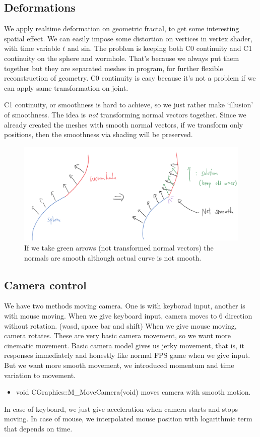 \documentclass[a4paper]{article}
\begin{document}
\subsection{Deformations}
We apply realtime deformation on geometric fractal, to get some interesting spatial effect.
We can easily impose some distortion on vertices in vertex shader, with time variable $t$ and sin.
The problem is keeping both C0 continuity and C1 continuity on the sphere and wormhole.
That's because we always put them together but they are separated meshes in program, for further flexible reconstruction of geometry.
C0 continuity is easy because it's not a problem if we can apply same transformation on joint.

C1 continuity, or smoothness is hard to achieve, so we just rather make `illusion' of smoothness.
The idea is \textit{not} transforming normal vectors together.
Since we already created the meshes with smooth normal vectors, if we transform only positions, then the smoothness via shading will be preserved.

\begin{figure}[H]
\centering
\includegraphics[scale=0.5]{smooth.png}
\caption[q]{If we take green arrows (not transformed normal vectors) the normals are smooth although actual curve is not smooth.}
\label{fig:tree}
\end{figure}

\subsection{Camera control}
We have two methods moving camera.
One is with keyborad input, another is with mouse moving.
When we give keyboard input, camera moves to 6 direction without rotation. (wasd, space bar and shift)
When we give mouse moving, camera rotates.
These are very basic camera movement, so we want more cinematic movement.
Basic camera model gives us jerky movement, that is, it responses immediately and honestly like normal FPS game when we give input.
But we want more smooth movement, we introduced momentum and time variation to movement.
\begin{itemize}
  \item void CGraphics::M\_MoveCamera(void) moves camera with smooth motion.
\end{itemize}
In case of keyboard, we just give acceleration when camera starts and stops moving.
In case of mouse, we interpolated mouse position with logarithmic term that depends on time.
\end{document}
